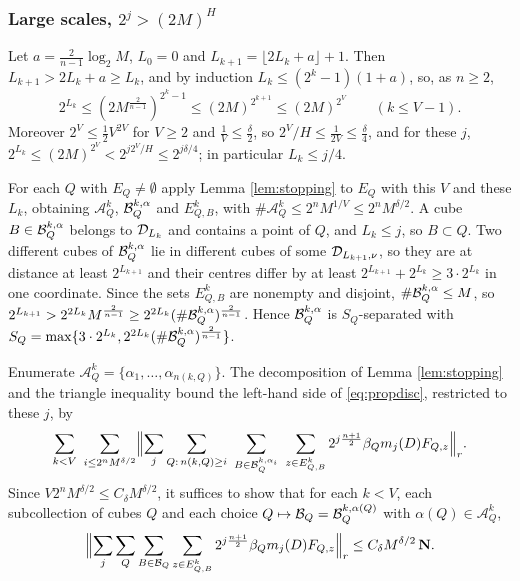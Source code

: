 \subsubsection*{Large scales, $2^j>(2M)^H$}
Let $a=\frac2{n-1}\log_2M$, $L_0=0$ and $L_{k+1}=\lfloor2L_k+a\rfloor+1$. Then $L_{k+1}>2L_k+a\ge L_k$, and by induction
$L_k\le(2^k-1)(1+a)$, so, as $n\ge2$,
\begin{equation}\label{eq:Lkbound}
2^{L_k}\le(2M^{\frac2{n-1}})^{2^k-1}\le(2M)^{2^{k+1}}\le(2M)^{2^V}\qquad(k\le V-1).
\end{equation}
Moreover $2^V\le\frac12V^{2V}$ for $V\ge2$ and $\frac1V\le\frac\delta2$, so $2^V/H\le\frac1{2V}\le\frac\delta4$, and for these $j$,
$2^{L_k}\le(2M)^{2^V}<2^{j2^V/H}\le2^{j\delta/4}$; in particular $L_k\le j/4$.

For each $Q$ with $E_Q\ne\emptyset$ apply Lemma \ref{lem:stopping} to $E_Q$ with this $V$ and these $L_k$, obtaining
$\mathcal A^k_Q$, $\mathcal B^{k,\alpha}_Q$ and $E^k_{Q,B}$, with $\#\mathcal A^k_Q\le2^nM^{1/V}\le2^nM^{\delta/2}$. A cube
$B\in\mathcal B^{k,\alpha}_Q$ belongs to $\mathcal D_{L_k}$ and contains a point of $Q$, and $L_k\le j$, so $B\subset Q$. Two different
cubes of $\mathcal B^{k,\alpha}_Q$ lie in different cubes of some $\mathcal D_{L_{k+1},\nu}$, so they are at distance at least
$2^{L_{k+1}}$ and their centres differ by at least $2^{L_{k+1}}+2^{L_k}\ge3\cdot2^{L_k}$ in one coordinate. Since the
sets $E^k_{Q,B}$ are nonempty and disjoint, $\#\mathcal B^{k,\alpha}_Q\le M$, so
$2^{L_{k+1}}>2^{2L_k}M^{\frac2{n-1}}\ge2^{2L_k}(\#\mathcal B^{k,\alpha}_Q)^{\frac2{n-1}}$. Hence $\mathcal B^{k,\alpha}_Q$ is $S_Q$-separated with
$S_Q=\max\{3\cdot2^{L_k},2^{2L_k}(\#\mathcal B^{k,\alpha}_Q)^{\frac2{n-1}}\}$.

Enumerate $\mathcal A^k_Q=\{\alpha_1,\dots,\alpha_{n(k,Q)}\}$. The decomposition of Lemma \ref{lem:stopping} and the
triangle inequality bound the left-hand side of \eqref{eq:propdisc}, restricted to these $j$, by
\[
\sum_{k<V}\ \sum_{i\le2^nM^{\delta/2}}\Bigl\|\sum_{j}\sum_{Q:\,n(k,Q)\ge i}\ \sum_{B\in\cB^{k,\alpha_i}_Q}\ \sum_{z\in E^k_{Q,B}}
2^{j\frac{n+1}2}\beta_Qm_j(D)F_{Q,z}\Bigr\|_r .
\]
Since $V2^nM^{\delta/2}\le C_\delta M^{\delta/2}$, it suffices to show that for each $k<V$, each subcollection of cubes
$Q$ and each choice $Q\mapsto\mathcal B_Q=\mathcal B^{k,\alpha(Q)}_Q$ with $\alpha(Q)\in\mathcal A^k_Q$,
\begin{equation}\label{eq:largeclaim}
\Bigl\|\sum_j\sum_Q\sum_{B\in\mathcal B_Q}\sum_{z\in E^k_{Q,B}}2^{j\frac{n+1}2}\beta_Qm_j(D)F_{Q,z}\Bigr\|_r\le C_\delta M^{\delta/2}\,\mathbf N .
\end{equation}

